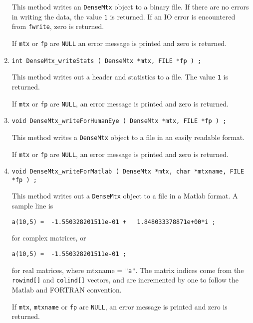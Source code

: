 \begin{enumerate}
\par
This method writes an {\tt DenseMtx} object to a binary file.
If there are no errors in writing the data,
the value {\tt 1} is returned.
If an IO error is encountered from {\tt fwrite}, zero is returned.
\par {}
If {\tt mtx} or {\tt fp} are {\tt NULL} an error message
is printed and zero is returned.
\item
\begin{verbatim}
int DenseMtx_writeStats ( DenseMtx *mtx, FILE *fp ) ;
\end{verbatim}
\par
This method writes out a header and statistics to a file.
The value {\tt 1} is returned.
\par {}
If {\tt mtx} or {\tt fp} are {\tt NULL},
an error message is printed and zero is returned.
\item
\begin{verbatim}
void DenseMtx_writeForHumanEye ( DenseMtx *mtx, FILE *fp ) ;
\end{verbatim}
\par
This method writes a {\tt DenseMtx} object to a file in an easily
readable format.
\par {}
If {\tt mtx} or {\tt fp} are {\tt NULL},
an error message is printed and zero is returned.
\item
\begin{verbatim}
void DenseMtx_writeForMatlab ( DenseMtx *mtx, char *mtxname, FILE *fp ) ;
\end{verbatim}
\par
This method writes out a {\tt DenseMtx} object to a file in a Matlab
format.
A sample line is
\begin{verbatim}
a(10,5) =  -1.550328201511e-01 +   1.848033378871e+00*i ;
\end{verbatim}
for complex matrices, or
\begin{verbatim}
a(10,5) =  -1.550328201511e-01 ;
\end{verbatim}
for real matrices, where mtxname = {\tt "a"}.
The matrix indices come from the {\tt rowind[]} and {\tt colind[]}
vectors, and are incremented by one to follow the Matlab and
FORTRAN convention.
\par {}
If {\tt mtx}, {\tt mtxname} or {\tt fp} are {\tt NULL},
an error message is printed and zero is returned.
\end{enumerate}
